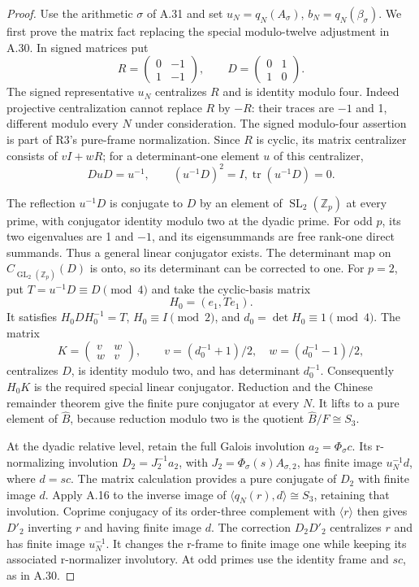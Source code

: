 \begin{proof}
Use the arithmetic \(\sigma\) of A.31 and set
\(u_N=q_N(A_\sigma)\), \(b_N=q_N(\beta_\sigma)\).
We first prove the matrix fact replacing the special
modulo-twelve adjustment in A.30. In signed matrices put
\[
 R=\begin{pmatrix}0&-1\\1&-1\end{pmatrix},\qquad
 D=\begin{pmatrix}0&1\\1&0\end{pmatrix}.
\]
The signed representative \(u_N\) centralizes \(R\)
and is identity modulo four. Indeed projective
centralization cannot replace \(R\) by \(-R\):
their traces are \(-1\) and 1, different modulo
every \(N\) under consideration. The signed
modulo-four assertion is part of R3's pure-frame
normalization. Since \(R\) is cyclic, its matrix
centralizer consists of \(vI+wR\); for a
determinant-one element \(u\) of this centralizer,
\[
              DuD=u^{-1},\qquad
              (u^{-1}D)^2=I,
              \operatorname{tr}(u^{-1}D)=0.
 \tag{A.33.2}
\]

The reflection \(u^{-1}D\) is conjugate to \(D\)
by an element of \(\operatorname{SL}_2(\mathbb Z_p)\)
at every prime, with conjugator identity modulo two
at the dyadic prime. For odd \(p\), its two eigenvalues
are 1 and \(-1\), and its eigensummands are free
rank-one direct summands. Thus a general linear
conjugator exists. The determinant map on
\(C_{\operatorname{GL}_2(\mathbb Z_p)}(D)\) is onto,
so its determinant can be corrected to one.
For \(p=2\), put \(T=u^{-1}D\equiv D\pmod4\)
and take the cyclic-basis matrix
\[
                   H_0=(e_1,Te_1).
\]
It satisfies \(H_0DH_0^{-1}=T\),
\(H_0\equiv I\pmod2\), and
\(d_0=\det H_0\equiv1\pmod4\).
The matrix
\[
 K=\begin{pmatrix}v&w\\w&v\end{pmatrix},\qquad
 v=(d_0^{-1}+1)/2,\quad w=(d_0^{-1}-1)/2,
\]
centralizes \(D\), is identity modulo two,
and has determinant \(d_0^{-1}\).
Consequently \(H_0K\) is the required special
linear conjugator. Reduction and the Chinese
remainder theorem give the finite pure conjugator
at every \(N\). It lifts to a pure element of
\(\widehat B\), because reduction modulo two
is the quotient \(\widehat B/F\cong S_3\).

At the dyadic relative level, retain the full
Galois involution \(a_2=\Phi_\sigma c\).
Its r-normalizing involution
\(D_2=J_2^{-1}a_2\), with
\(J_2=\Phi_\sigma(s)A_{\sigma,2}\), has finite
image \(u_N^{-1}d\), where \(d=sc\).
The matrix calculation provides a pure conjugate
of \(D_2\) with finite image \(d\).
Apply A.16 to the inverse image of
\(\langle q_N(r),d\rangle\cong S_3\), retaining
that involution. Coprime conjugacy of its
order-three complement with \(\langle r\rangle\)
then gives \(D'_2\) inverting \(r\) and having
finite image \(d\). The correction
\(D_2D'_2\) centralizes \(r\) and has finite
image \(u_N^{-1}\). It changes the r-frame
to finite image one while keeping its associated
r-normalizer involutory. At odd primes use the
identity frame and \(sc\), as in A.30.


\end{proof}
